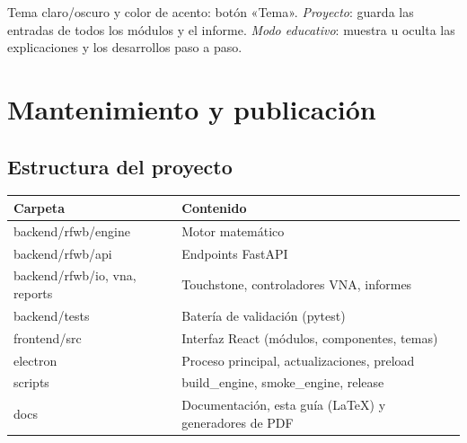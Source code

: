 


\begin{enlaapp}
Tema claro/oscuro y color de acento: botón «Tema». \emph{Proyecto}: guarda las entradas de todos los módulos y el informe.
\emph{Modo educativo}: muestra u oculta las explicaciones y los desarrollos paso a paso.
\end{enlaapp}

\chapter{Mantenimiento y publicación}

\section{Estructura del proyecto}
\begin{center}\small
\begin{tabular}{@{}>{\ttfamily}ll@{}}\toprule
\normalfont\textbf{Carpeta} & \textbf{Contenido}\\ \midrule
backend/rfwb/engine & Motor matemático\\
backend/rfwb/api & Endpoints FastAPI\\
backend/rfwb/io, vna, reports & Touchstone, controladores VNA, informes\\
backend/tests & Batería de validación (pytest)\\
frontend/src & Interfaz React (módulos, componentes, temas)\\
electron & Proceso principal, actualizaciones, preload\\
scripts & build\_engine, smoke\_engine, release\\
docs & Documentación, esta guía (LaTeX) y generadores de PDF\\ \bottomrule
\end{tabular}
\end{center}

